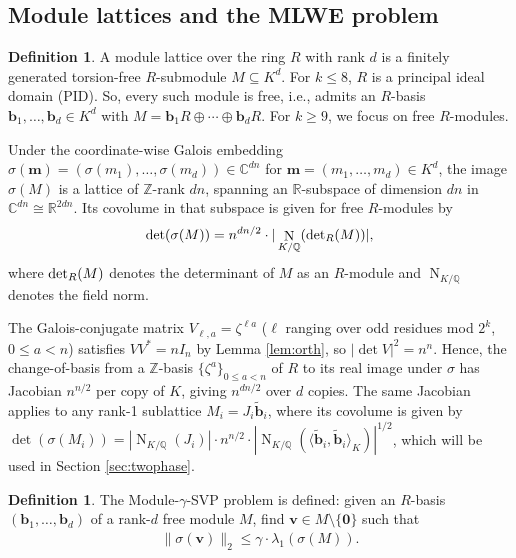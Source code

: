 \documentclass[11pt,a4paper]{article}
\theoremstyle{plain}
\theoremstyle{definition}
\newtheorem{definition}[theorem]{Definition}
\theoremstyle{remark}
\DeclareMathOperator{\Nm}{N}
\newcommand{\Z}{\mathbb{Z}}
\newcommand{\Q}{\mathbb{Q}}
\newcommand{\R}{\mathbb{R}}
\newcommand{\C}{\mathbb{C}}
\begin{document}
\subsection{Module lattices and the MLWE problem}\label{subsec:module}

\begin{definition}
\label{def:Modlattice}
A module lattice over the ring $R$ with rank $d$ is a finitely generated torsion-free $R$-submodule $M\subseteq K^d$. For $k\le 8$, $R$ is a principal ideal domain (PID). So, every such module is free, i.e., admits an $R$-basis $\mathbf{b}_1, \dots, \mathbf{b}_d\in K^d$ with $M=\mathbf{b}_1 R\oplus\cdots\oplus \mathbf{b}_d R$. For $k\ge 9$, we focus on free $R$-modules.

\end{definition}

Under the coordinate-wise Galois embedding $\sigma(\mathbf{m})=(\sigma(m_1), \dots, \sigma(m_d))\in\C^{dn}$ for $\mathbf{m}=(m_1, \dots, m_d)\in K^d$, the image $\sigma(M)$ is a lattice of $\Z$-rank $dn$, spanning an $\R$-subspace of dimension $dn$ in $\C^{dn}\cong\R^{2dn}$. Its covolume in that subspace is given for free $R$-modules by
\begin{align}
  \det(\sigma(M))=n^{dn/2}\cdot |\Nm_{K/\Q}({\rm det}_R(M))|,
  \label{E:detsigmaM}
  \end{align}
where ${\rm det}_R(M)$ denotes the determinant of $M$ as an $R$-module and $\Nm_{K/\Q}$ denotes the field norm.

The Galois-conjugate matrix $V_{\ell,a}=\zeta^{\ell a}$ ($\ell$ ranging over odd residues mod $2^k$, $0\le a<n$) satisfies $VV^*=nI_n$ by Lemma \ref{lem:orth}, so $|\det V|^2=n^n$. Hence, the change-of-basis from a $\Z$-basis $\{\zeta^a\}_{0\le a<n}$ of $R$ to its real image under $\sigma$ has Jacobian $n^{n/2}$ per copy of $K$, giving $n^{dn/2}$ over $d$ copies. The same Jacobian applies to any rank-1 sublattice $M_i=J_i\tilde{\mathbf{b}}_i$, where its covolume is given by $\det(\sigma(M_i))=|\Nm_{K/\Q}(J_i)|\cdot n^{n/2}\cdot |\Nm_{K/\Q}(\langle\tilde{\mathbf{b}}_i, \tilde{\mathbf{b}}_i\rangle_K)|^{1/2}$, which will be used in 
Section \ref{sec:twophase}.

\begin{definition}
\label{D:modsvp}
The Module-$\gamma$-SVP problem is defined: given an $R$-basis $(\mathbf{b}_1, \dots, \mathbf{b}_d)$ of a rank-$d$ free module $M$, find $\mathbf{v}\in M\setminus\{\mathbf{0}\}$ such that 
\begin{align}
  \|\sigma(\mathbf{v})\|_2 \le \gamma\cdot\lambda_1(\sigma(M)).
  \label{E:modsvp}
\end{align}

\end{definition}
\end{document}
